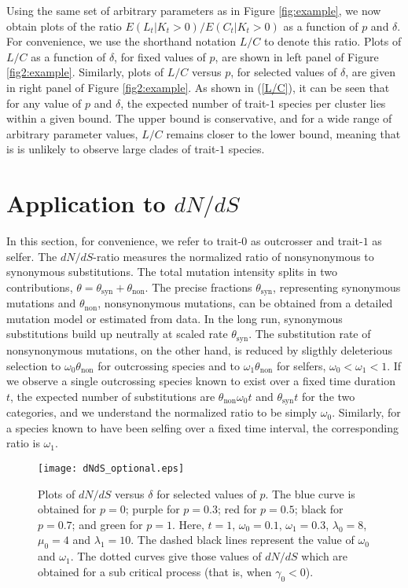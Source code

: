 \documentclass[a4paper,11pt]{article}
\theoremstyle{plain}
\theoremstyle{definition}
\numberwithin{equation}{section}
\begin{document}
Using the same set of arbitrary parameters 
as in Figure \ref{fig:example}, we now obtain plots 
of the ratio  $E(L_t|K_t>0)/E(C_t|K_t>0)$ as a function 
of $p$ and $\delta$. For convenience, we use the shorthand 
notation $L/C$ to denote this ratio. 
Plots of $L/C$ as a function of $\delta$, for fixed values of $p$, are shown 
in left panel of Figure \ref{fig2:example}. Similarly, plots of 
$L/C$ versus $p$, for selected values of $\delta$, 
are given in right panel of Figure \ref{fig2:example}.
As shown in (\ref{L/C}), it can be seen that for any value of $p$ and $\delta$, 
the expected number of trait-$1$ species per cluster lies within a given bound. 
The upper bound is conservative, and for a wide range of arbitrary parameter 
values, $L/C$ remains closer to the lower bound,  
meaning that is is unlikely to observe large clades of trait-$1$ species.

 \section{Application to $dN/dS$}

In this section, for convenience, we refer to trait-$0$ as outcrosser
and trait-$1$ as selfer.
The $dN/dS$-ratio measures the normalized ratio of nonsynonymous to
synonymous substitutions. The total mutation intensity  splits in two
contributions, $\theta=\theta_\mathrm{syn}+\theta_\mathrm{non}$. The
precise fractions $\theta_\mathrm{syn}$, representing synonymous
mutations and $\theta_\mathrm{non}$, nonsynonymous mutations, can be
obtained from a detailed mutation model \cite{mugal_etal} or estimated from data.
  In the long run, synonymous substitutions build up
neutrally at scaled rate $\theta_\mathrm{syn}$.  The substitution rate
of nonsynonymous mutations, on the other hand, is reduced by sligthly
deleterious selection to $\omega_0\theta_\mathrm{non}$ for outcrossing
species and to $\omega_1\theta_\mathrm{non}$ for selfers,
$\omega_0<\omega_1<1$.  If we observe a single outcrossing species
known to exist over a fixed time duration $t$, the expected number of
substitutions are $\theta_\mathrm{non}\omega_0 t$ and
$\theta_\mathrm{syn} t$ for the two categories, and we understand the
normalized ratio to be simply $\omega_0$. Similarly, for a species
known to have been selfing over a fixed time interval, the
corresponding ratio is $\omega_1$.


\begin{figure*}[!t]
\centerline{\texttt{[image: dNdS\_optional.eps]}}
\caption{ Plots of $dN/dS$ versus $\delta$ for selected values of $p$. 
The blue curve is obtained for $p=0$; purple for $p=0.3$;
  red for $p=0.5$; black for $p=0.7$; and green for $p=1$.
  Here, $t=1$, $\omega_0=0.1$, $\omega_1=0.3$, $\lambda_0=8$,
  $\mu_0=4$ and $\lambda_1=10$. The dashed black lines represent 
  the value of $\omega_0$ and $\omega_1$. The dotted curves give those values 
  of $dN/dS$ which are obtained for a sub critical process (that is, when 
  $\gamma_0<0$).}
  \label{dNdSvsdelta_p2}
\end{figure*}
\end{document}
